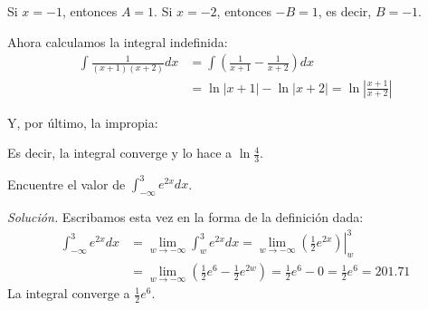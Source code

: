 Si $x=-1$, entonces $A=1$. Si $x=-2$, entonces $-B=1$, es decir, $B=-1$.

Ahora calculamos la integral indefinida:
{\small
\begin{align*}
\int \frac{1}{\left( x+1\right) \left( x+2\right) }dx&=\int \left( \frac{1}{
x+1}-\frac{1}{x+2}\right) dx\\
&=\ln \left\vert x+1\right\vert -\ln \left\vert
x+2\right\vert =\ln \left\vert \frac{x+1}{x+2}\right\vert
\end{align*}
}

Y, por último, la impropia:



Es decir, la integral converge y lo hace a $\ln \frac{4}{3}.$

\begin{ejemplo}
\textnormal{Encuentre el valor de} $\displaystyle \int_{-\infty }^{3}e^{2x}dx$.
\end{ejemplo}
\textit{Solución.} Escribamos esta vez en la forma de la definición dada:
{\small
\begin{align*}
\int_{-\infty }^{3}e^{2x}dx&=\lim_{w\rightarrow -\infty
}\int_{w}^{3}e^{2x}dx=\left.\lim_{w\rightarrow -\infty }\left( \frac{1}{2}%
e^{2x}\right)\right\vert_{w}^{3} \\
&=\lim_{w\rightarrow -\infty }\left( \frac{1}{2}e^{6}-\frac{1}{2}%
e^{2w}\right)=\frac{1}{2}e^{6}-0=\frac{1}{2}e^{6}=201\text{.}71
\end{align*}
}
La integral converge a $\frac{1}{2}e^{6}.$

